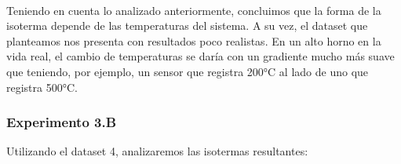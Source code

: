 \

Teniendo en cuenta lo analizado anteriormente, concluimos que la forma de la isoterma depende de las temperaturas del sistema. A su vez, el dataset que planteamos nos presenta con resultados poco realistas. En un alto horno en la vida real, el cambio de temperaturas se daría con un gradiente mucho más suave que teniendo, por ejemplo, un sensor que registra 200°C al lado de uno que registra 500°C.

\newpage

\subsubsection{Experimento 3.B}

Utilizando el dataset 4, analizaremos las isotermas resultantes:

